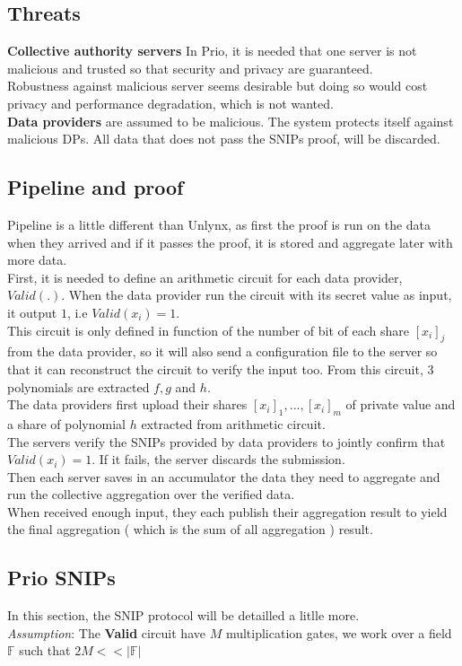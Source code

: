 \documentclass{article}
\begin{document}
\subsection{Threats}
\textbf{Collective authority servers} In Prio, it is needed that one server is not malicious and trusted so that security and privacy are guaranteed.\\
Robustness against malicious server seems desirable but doing so would cost privacy and performance degradation, which is not wanted.\\
\textbf{Data providers} are assumed to be malicious. The system protects itself against malicious DPs. All data that does not pass the SNIPs proof, will be discarded.\\

\subsection{Pipeline and proof}
Pipeline is a little different than Unlynx, as first the proof is run on the data when they arrived and if it passes the proof, it is stored and aggregate later with more data.\\
First, it is needed to define an arithmetic circuit for each data provider, $Valid(.)$.
When the data provider run the circuit with its secret value as input, it output $1$, i.e $Valid(x_i)=1$.\\
This circuit is only defined in function of the number of bit of each share $[x_i]_j$ from the data provider, so it will also send a configuration file to the server so that it can reconstruct the circuit to verify the input too. From this circuit, $3$ polynomials are extracted $f,g $ and $h$.\\

The data providers first upload their shares $[x_i]_1,...,[x_i]_m$ of private value and a share of polynomial $h$ extracted from arithmetic circuit.\\
The servers verify the SNIPs provided by data providers to jointly confirm that $Valid(x_i) = 1$. If it fails, the server discards the submission.\\
Then each server saves in an accumulator the data they need to aggregate and run the collective aggregation over the verified data.\\
When received enough input, they each publish their aggregation result to yield the final aggregation ( which is the sum of all aggregation ) result.

\subsection{Prio SNIPs}
In this section, the SNIP protocol will be detailled a litlle more.\\
\textit{Assumption}: The \textbf{Valid} circuit have $M$ multiplication gates, we work over a field $\mathbb{F}$ such that $ 2M << |\mathbb{F}| $\\
\end{document}
